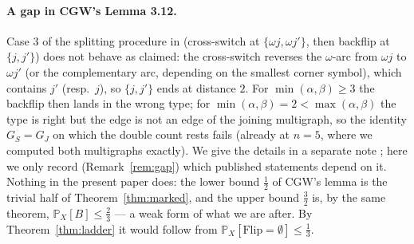 \documentclass[11pt]{article}
\theoremstyle{definition}
\renewcommand{\Pr}{\mathbb{P}}
\begin{document}
\paragraph{A gap in CGW's Lemma 3.12.}  Case 3 of the splitting procedure in
\cite{CGW08} (cross-switch at $\{\omega j,\omega j'\}$, then backflip at $\{j,j'\}$) does
not behave as claimed: the cross-switch reverses the $\omega$-arc from $\omega j$ to
$\omega j'$ (or the complementary arc, depending on the smallest corner symbol), which
contains $j'$ (resp.\ $j$), so $\{j,j'\}$ ends at distance $2$.  For $\min(\alpha,\beta)\ge3$
the backflip then lands in the wrong type; for $\min(\alpha,\beta)=2<\max(\alpha,\beta)$ the
type is right but the edge is not an edge of the joining multigraph, so the identity
$G_S=G_J$ on which the double count rests fails (already at $n=5$, where we computed both
multigraphs exactly).  We give the details in a separate note \cite{gapnote}; here we only record
(Remark~\ref{rem:gap}) which published statements depend on it.  Nothing in the present
paper does: the lower bound $\tfrac12$ of CGW's lemma is the trivial half of
Theorem~\ref{thm:marked}, and the upper bound $\tfrac32$ is, by the same theorem,
$\Pr_X[B]\le\tfrac23$ --- a weak form of what we are after.  By Theorem~\ref{thm:ladder}
it would follow from $\Pr_X[\mathrm{Flip}=\emptyset]\le\tfrac13$.
\end{document}
